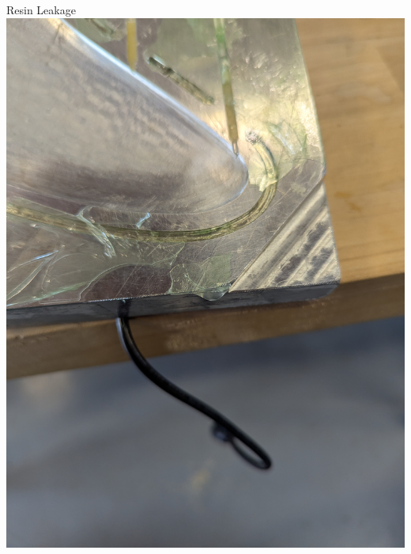 \begin{frame}{Resin Leakage}
    \centering
    \includegraphics[height=0.5\textheight,keepaspectratio]{images/sf_mold_tip_leakage.jpg}

\end{frame}
